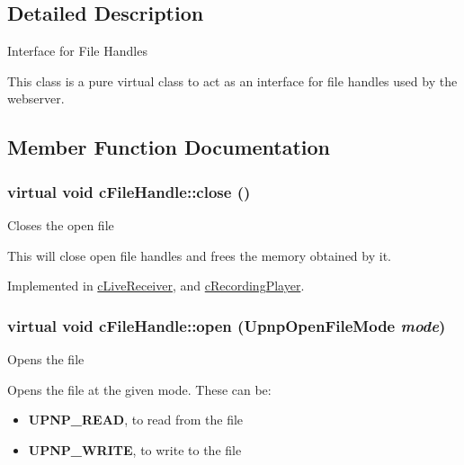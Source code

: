 \subsection{Detailed Description}
Interface for File Handles

This class is a pure virtual class to act as an interface for file handles used by the webserver. 

\subsection{Member Function Documentation}
\hypertarget{classcFileHandle_d7eaed7d254a64c85a48c3968238b93d}{
\subsubsection[{close}]{\setlength{\rightskip}{0pt plus 5cm}virtual void cFileHandle::close ()}}
\label{classcFileHandle_d7eaed7d254a64c85a48c3968238b93d}


Closes the open file

This will close open file handles and frees the memory obtained by it. 

Implemented in \hyperlink{classcLiveReceiver_5b8beb2bc6809aacbdb087e31e836a27}{cLiveReceiver}, and \hyperlink{classcRecordingPlayer_5e81aeecd16f89e432690a9b05d8dd6a}{cRecordingPlayer}.\hypertarget{classcFileHandle_cdf4f4d07382de675b498d85544ea1b6}{
\subsubsection[{open}]{\setlength{\rightskip}{0pt plus 5cm}virtual void cFileHandle::open (UpnpOpenFileMode {\em mode})}}
\label{classcFileHandle_cdf4f4d07382de675b498d85544ea1b6}


Opens the file

Opens the file at the given mode. These can be:\begin{itemize}
\item {\bf UPNP\_\-READ}, to read from the file\item {\bf UPNP\_\-WRITE}, to write to the file\end{itemize}


